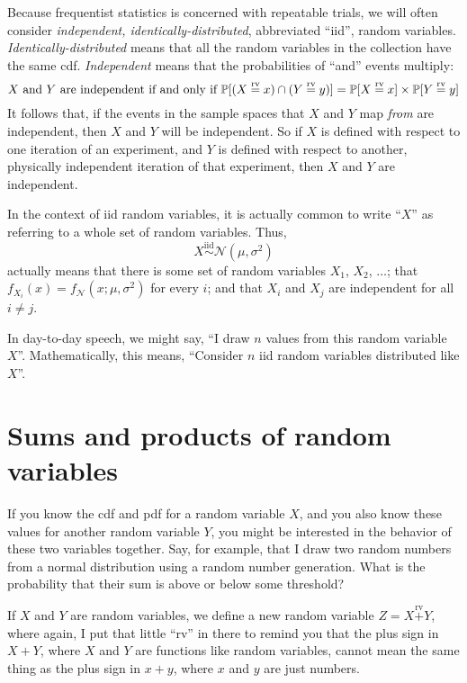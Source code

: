 Because frequentist statistics is concerned with repeatable trials, we will often
consider \emph{independent, identically-distributed},
abbreviated ``iid'', random variables. \emph{Identically-distributed} means that
all the random variables in the collection have the same cdf. \emph{Independent}
means that the probabilities of ``and'' events multiply:
\begin{equation*}
    \text{$X$ and $Y$ are independent if and only if }
    \mathbb{P}[(X \stackrel{\text{rv}}{=} x) \cap (Y \stackrel{\text{rv}}{=} y)]
    = \mathbb{P}[X \stackrel{\text{rv}}{=} x] \times \mathbb{P}[Y \stackrel{\text{rv}}{=} y]
\end{equation*}
It follows that, if the events in the sample spaces that $X$ and $Y$ map \emph{from}
are independent, then $X$ and $Y$ will be independent. So if $X$ is defined with
respect to one iteration of an experiment, and $Y$ is defined with respect to another,
physically independent iteration of that experiment, then $X$ and $Y$ are independent.

In the context of iid random variables, it is actually common to write ``$X$'' as
referring to a whole set of random variables. Thus,
\begin{equation*}
X \stackrel{\text{iid}}{\sim} \mathcal{N}(\mu, \sigma^2)
\end{equation*}
actually means that there is some set of random variables $X_1$, $X_2$, $\ldots$;
that $f_{X_i}(x) = f_\mathcal{N}(x; \mu, \sigma^2)$ for every $i$; and that
$X_i$ and $X_j$ are independent for all $i \neq j$.

In day-to-day speech, we might say, ``I draw $n$ values from this random
variable $X$''. Mathematically, this means, ``Consider $n$ iid random
variables distributed like $X$''.

\section{Sums and products of random variables}

If you know the cdf and pdf for a random variable $X$, and you also know these
values for another random variable $Y$, you might be interested in the
behavior of these two variables together. Say, for example, that I draw two
random numbers from a normal distribution using a random number generation. What
is the probability that their sum is above or below some threshold?

If $X$ and $Y$ are random variables, we define a new random variable
$Z = X \stackrel{\mathrm{rv}}{+} Y$, where again, I put that little ``rv''
in there to remind you that the
plus sign in $X + Y$, where $X$ and $Y$ are functions like random variables,
cannot mean the same thing as the plus sign in $x + y$, where $x$ and $y$
are just numbers.

